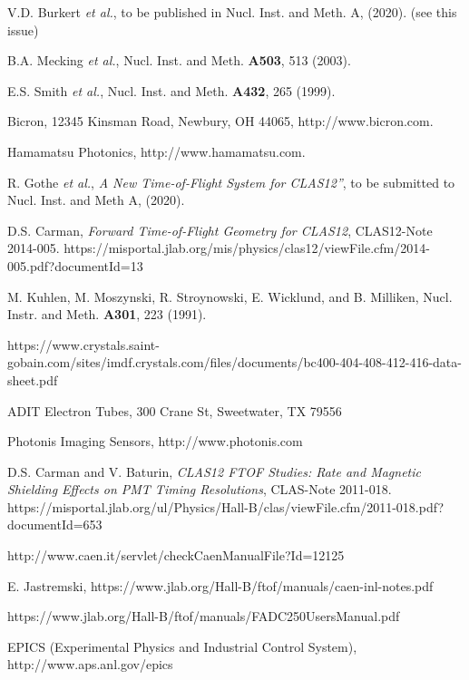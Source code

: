 \documentclass{elsart}
\begin{document}
\begin{thebibliography}{99}

V.D. Burkert {\it et al.}, to be published in Nucl. Inst. and Meth. A, (2020). (see this issue)
  
B.A. Mecking {\it et al.}, Nucl. Inst. and Meth. {\bf A503}, 513 (2003).

E.S. Smith {\it et al.}, Nucl. Inst. and Meth. {\bf A432}, 265 (1999).

Bicron, 12345 Kinsman Road, Newbury, OH 44065, http://www.bicron.com.

Hamamatsu Photonics, http://www.hamamatsu.com.
  
R. Gothe {\it et al.}, {\it A New Time-of-Flight System for CLAS12''}, to be submitted to Nucl. Inst.
and Meth A, (2020).

D.S. Carman, {\it Forward Time-of-Flight Geometry for CLAS12}, CLAS12-Note 2014-005.
https://misportal.jlab.org/mis/physics/clas12/viewFile.cfm/2014-005.pdf?documentId=13

M. Kuhlen, M. Moszynski, R. Stroynowski, E. Wicklund, and B. Milliken, Nucl.  Instr. and Meth.
{\bf A301}, 223 (1991).

https://www.crystals.saint-gobain.com/sites/imdf.crystals.com/files/documents/bc400-404-408-412-416-data-sheet.pdf

ADIT Electron Tubes, 300 Crane St, Sweetwater, TX 79556
  
Photonis Imaging Sensors, http://www.photonis.com

D.S. Carman and V. Baturin, {\it CLAS12 FTOF Studies: Rate and Magnetic Shielding Effects on PMT Timing
Resolutions}, CLAS-Note 2011-018.\\
https://misportal.jlab.org/ul/Physics/Hall-B/clas/viewFile.cfm/2011-018.pdf?documentId=653
  
http://www.caen.it/servlet/checkCaenManualFile?Id=12125
  
E. Jastremski, https://www.jlab.org/Hall-B/ftof/manuals/caen-inl-notes.pdf

https://www.jlab.org/Hall-B/ftof/manuals/FADC250UsersManual.pdf
  
EPICS (Experimental Physics and Industrial Control System),\\ http://www.aps.anl.gov/epics


\end{thebibliography}
\end{document}
